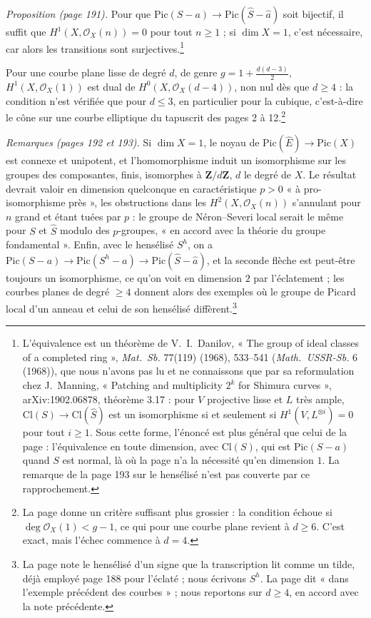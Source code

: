 \documentclass[11pt,a4paper]{article}
\begin{document}
\emph{Proposition (page 191).} Pour que
$\mathrm{Pic}(S - a) \to \mathrm{Pic}(\hat{S} - \hat{a})$ soit bijectif, il
suffit que $H^1(X, \mathcal{O}_X(n)) = 0$ pour tout $n \geq 1$ ; si
$\dim X = 1$, c'est nécessaire, car alors les transitions sont surjectives.\footnote{L'équivalence
est un théorème de V.~I.~Danilov, « The group of ideal classes of a completed
ring », \emph{Mat.\ Sb.} 77(119) (1968), 533--541 (\emph{Math.\ USSR-Sb.} 6
(1968)), que nous n'avons pas lu et ne connaissons que par sa reformulation
chez J.~Manning, « Patching and multiplicity $2^k$ for Shimura curves »,
arXiv:1902.06878, théorème 3.17 : pour $V$ projective lisse et $L$ très ample,
$\mathrm{Cl}(S) \to \mathrm{Cl}(\hat{S})$ est un isomorphisme si et seulement
si $H^1(V, L^{\otimes i}) = 0$ pour tout $i \geq 1$. Sous cette forme, l'énoncé
est plus général que celui de la page : l'équivalence en toute dimension, avec
$\mathrm{Cl}(S)$, qui est $\mathrm{Pic}(S - a)$ quand $S$ est normal, là où la
page n'a la nécessité qu'en dimension $1$. La remarque de la page 193 sur le
hensélisé n'est pas couverte par ce rapprochement.}

Pour une courbe plane lisse de degré $d$, de genre
$g = 1 + \frac{d(d-3)}{2}$, $H^1(X, \mathcal{O}_X(1))$ est dual de
$H^0(X, \mathcal{O}_X(d - 4))$, non nul dès que $d \geq 4$ : la condition n'est
vérifiée que pour $d \leq 3$, en particulier pour la cubique, c'est-à-dire le
cône sur une courbe elliptique du tapuscrit des pages 2 à 12.\footnote{La page
donne un critère suffisant plus grossier : la condition échoue si
$\deg \mathcal{O}_X(1) < g - 1$, ce qui pour une courbe plane revient à
$d \geq 6$. C'est exact, mais l'échec commence à $d = 4$.}

\emph{Remarques (pages 192 et 193).} Si $\dim X = 1$, le noyau de
$\mathrm{Pic}(\hat{E}) \to \mathrm{Pic}(X)$ est connexe et unipotent, et
l'homomorphisme induit un isomorphisme sur les groupes des composantes, finis,
isomorphes à $\mathbf{Z}/d\mathbf{Z}$, $d$ le degré de $X$. Le résultat
devrait valoir en dimension quelconque en caractéristique $p > 0$ « à
pro-isomorphisme près », les obstructions dans les $H^2(X, \mathcal{O}_X(n))$
s'annulant pour $n$ grand et étant tuées par $p$ : le groupe de Néron--Severi
local serait le même pour $S$ et $\hat{S}$ modulo des $p$-groupes, « en accord
avec la théorie du groupe fondamental ». Enfin, avec le hensélisé $S^h$, on a
$\mathrm{Pic}(S - a) \to \mathrm{Pic}(S^h - a) \to \mathrm{Pic}(\hat{S} - \hat{a})$,
et la seconde flèche est peut-être toujours un isomorphisme, ce qu'on voit en
dimension $2$ par l'éclatement ; les courbes planes de degré $\geq 4$
donnent alors des exemples où le groupe de Picard local d'un anneau et celui de
son hensélisé diffèrent.\footnote{La page note le hensélisé d'un signe que la
transcription lit comme un tilde, déjà employé page 188 pour l'éclaté ; nous
écrivons $S^h$. La page dit « dans l'exemple précédent des courbes » ; nous
reportons sur $d \geq 4$, en accord avec la note précédente.}
\end{document}
